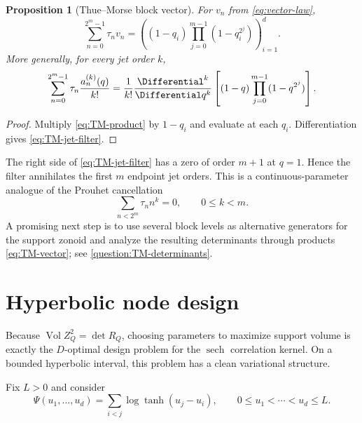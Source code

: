 \documentclass[11pt,a4paper]{article}
\newtheorem{proposition}[theorem]{Proposition}
\theoremstyle{definition}
\theoremstyle{remark}
\newcommand{\Vol}{\operatorname{Vol}}
\newcommand{\sech}{\operatorname{sech}}
\begin{document}
\begin{proposition}[Thue--Morse block vector]
\label{prop:TM-vector}
For $v_n$ from \eqref{eq:vector-law},
\begin{equation}
  \sum_{n=0}^{2^m-1}\tau_nv_n
   =\left(
      (1-q_i)\prod_{j=0}^{m-1}(1-q_i^{2^j})
     \right)_{i=1}^d.
  \label{eq:TM-vector}
\end{equation}
More generally, for every jet order $k$,
\begin{equation}
 \sum_{n=0}^{2^m-1}\tau_n\frac{a_n^{(k)}(q)}{k!}
  =\frac1{k!}\frac{\Differential^k}{\Differential q^k}
    \left[(1-q)\prod_{j=0}^{m-1}(1-q^{2^j})\right].
 \label{eq:TM-jet-filter}
\end{equation}
\end{proposition}

\begin{proof}
Multiply \eqref{eq:TM-product} by $1-q_i$ and evaluate at each $q_i$.  Differentiation gives \eqref{eq:TM-jet-filter}.
\end{proof}

The right side of \eqref{eq:TM-jet-filter} has a zero of order $m+1$ at $q=1$.  Hence the filter annihilates the first $m$ endpoint jet orders.  This is a continuous-parameter analogue of the Prouhet cancellation
\begin{equation}
  \sum_{n<2^m}\tau_nn^k=0,
  \qquad 0\le k<m.
  \label{eq:Prouhet}
\end{equation}
A promising next step is to use several block levels as alternative generators for the support zonoid and analyze the resulting determinants through products \eqref{eq:TM-vector}; see \cref{question:TM-determinants}.


\section{Hyperbolic node design}
\label{sec:node-design}

Because $\Vol Z_Q^2=\det R_Q$, choosing parameters to maximize support volume is exactly the $D$-optimal design problem for the $\sech$ correlation kernel.  On a bounded hyperbolic interval, this problem has a clean variational structure.

Fix $L>0$ and consider
\begin{equation}
  \Psi(u_1,\ldots,u_d)
   =\sum_{i<j}\log\tanh(u_j-u_i),
  \qquad 0\le u_1<\cdots<u_d\le L.
  \label{eq:design-objective}
\end{equation}
\end{document}
